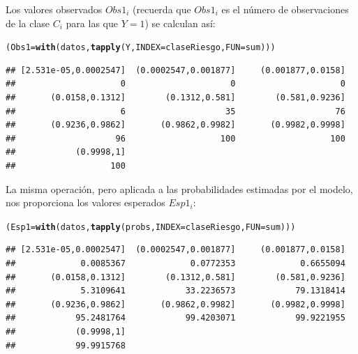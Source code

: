 \documentclass[10pt,a4paper]{article}\usepackage[]{graphicx}\usepackage[]{color}
\makeatletter
\newcommand{\hlstd}[1]{\textcolor[rgb]{0.345,0.345,0.345}{#1}}%
\newcommand{\hlkwb}[1]{\textcolor[rgb]{0.69,0.353,0.396}{#1}}%
\newcommand{\hlkwc}[1]{\textcolor[rgb]{0.333,0.667,0.333}{#1}}%
\newcommand{\hlkwd}[1]{\textcolor[rgb]{0.737,0.353,0.396}{\textbf{#1}}}%
\newenvironment{kframe}{%
 \def\at@end@of@kframe{}%
 \ifinner\ifhmode%
  \def\at@end@of@kframe{\end{minipage}}%
  \begin{minipage}{\columnwidth}%
 \fi\fi%
 \def\FrameCommand##1{\hskip\@totalleftmargin \hskip-\fboxsep
 \colorbox{shadecolor}{##1}\hskip-\fboxsep
     \hskip-\linewidth \hskip-\@totalleftmargin \hskip\columnwidth}%
 \MakeFramed {\advance\hsize-\width
   \@totalleftmargin\z@ \linewidth\hsize
   \@setminipage}}%
 {\par\unskip\endMakeFramed%
 \at@end@of@kframe}
\newenvironment{knitrout}{}{} %
\makeatother
\begin{document}
Los valores observados $Obs1_i$ (recuerda que $Obs1_i$ es el número de observaciones de la clase $C_i$ para las que $Y=1$) se calculan así:
\begin{knitrout}
\color{fgcolor}\begin{kframe}
\begin{alltt}
\hlstd{(Obs1} \hlkwb{=} \hlkwd{with}\hlstd{(datos,} \hlkwd{tapply}\hlstd{(Y,} \hlkwc{INDEX} \hlstd{= claseRiesgo,} \hlkwc{FUN} \hlstd{= sum)) )}
\end{alltt}
\begin{verbatim}
## [2.531e-05,0.0002547]  (0.0002547,0.001877]     (0.001877,0.0158] 
##                     0                     0                     0 
##       (0.0158,0.1312]        (0.1312,0.581]        (0.581,0.9236] 
##                     6                    35                    76 
##       (0.9236,0.9862]       (0.9862,0.9982]       (0.9982,0.9998] 
##                    96                   100                   100 
##            (0.9998,1] 
##                   100
\end{verbatim}
\end{kframe}
\end{knitrout}




La misma operación, pero aplicada a las probabilidades estimadas por el modelo, nos proporciona los valores esperados $Esp1_i$:

\begin{knitrout}
\color{fgcolor}\begin{kframe}
\begin{alltt}
\hlstd{(Esp1} \hlkwb{=} \hlkwd{with}\hlstd{(datos,} \hlkwd{tapply}\hlstd{(probs,} \hlkwc{INDEX} \hlstd{= claseRiesgo,} \hlkwc{FUN} \hlstd{= sum)) )}
\end{alltt}
\begin{verbatim}
## [2.531e-05,0.0002547]  (0.0002547,0.001877]     (0.001877,0.0158] 
##             0.0085367             0.0772353             0.6655094 
##       (0.0158,0.1312]        (0.1312,0.581]        (0.581,0.9236] 
##             5.3109641            33.2236573            79.1318414 
##       (0.9236,0.9862]       (0.9862,0.9982]       (0.9982,0.9998] 
##            95.2481764            99.4203071            99.9221955 
##            (0.9998,1] 
##            99.9915768
\end{verbatim}
\end{kframe}
\end{knitrout}
\end{document}
